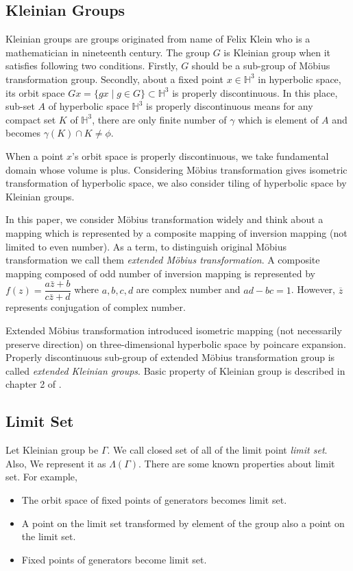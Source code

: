 \subsection{Kleinian Groups}

Kleinian groups are groups originated from name of Felix Klein who is
a mathematician in nineteenth century.
The group $G$ is Kleinian group when it satisfies following two
conditions. 
Firstly, $G$ should be a sub-group of M\"obius transformation group.
Secondly, about a fixed point $x\in\mathbb{H}^3$ in hyperbolic space,
its orbit space $Gx = \{ gx \mid g\in G\}\subset \mathbb{H}^3$
is properly discontinuous.
In this place, sub-set $A$ of hyperbolic space $\mathbb{H}^3$
is properly discontinuous means
for any compact set $K$ of $\mathbb{H}^3$,
there are only finite number of $\gamma$ which is element of $A$
and becomes $\gamma (K) \cap K \neq \phi$.

When a point $x$'s orbit space is properly discontinuous, we take
fundamental domain whose volume is plus.
Considering M\"obius transformation gives isometric transformation of
hyperbolic space, we also consider tiling of hyperbolic space by
Kleinian groups. 

In this paper, we consider M\"obius transformation widely and
think about a mapping which is represented by a composite mapping of
inversion mapping (not limited to even number).
As a term, to distinguish original M\"obius transformation
we call them \textit{extended M\"obius transformation}.
A composite mapping composed of odd number of inversion mapping
is represented by $f(z)=\dfrac{a{\bar{z}}+b}{c{\bar{z}}+d}$ where
$a, b, c, d$ are complex number and $ad-bc = 1$.
However, $\overline{z}$ represents conjugation of complex number.

Extended M\"obius transformation introduced isometric mapping (not
necessarily preserve direction) on three-dimensional hyperbolic space by
poincare expansion.
Properly discontinuous sub-group of extended M\"obius transformation group
is called \textit{extended Kleinian groups}.
Basic property of Kleinian group is described in chapter 2 of \cite{marden_2016}.

\subsection{Limit Set}

Let Kleinian group be $\Gamma$.
We call closed set of all of the limit point \textit{limit set}.
Also, We represent it as $\Lambda(\Gamma)$.
There are some known properties about limit set.
For example,
\begin{itemize}
 \item The orbit space of fixed points of generators becomes limit set.
 \item A point on the limit set transformed by element of the group 
       also a point on the limit set.
 \item Fixed points of generators become limit set.
\end{itemize}

